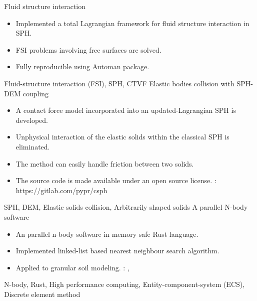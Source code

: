 \begin{experiences}
  \emptySeparator
  \experience
  {} {Fluid structure interaction}{}{}
  {}    {
    \begin{itemize}
        \item Implemented a total Lagrangian framework for fluid structure interaction in SPH.
        \item FSI problems involving free surfaces are solved.
        \item Fully reproducible using Automan package.
    \end{itemize}
  }
  {Fluid-structure interaction (FSI), SPH, CTVF}
  \emptySeparator
  \experience
  {} {Elastic bodies collision with SPH-DEM coupling}{}{}
  {} {
                      \begin{itemize}
                      \item  A contact force model incorporated into an updated-Lagrangian SPH is developed.
                      \item  Unphysical interaction of the elastic solids within the classical SPH is eliminated.
                      \item  The method can easily handle friction between two solids.
                      \item  The source code is made available under an open source license.
                        \faGithub:  {https://gitlab.com/pypr/csph}
                      \end{itemize}
                    }
                    {SPH, DEM, Elastic solids collision, Arbitrarily shaped solids}
  \emptySeparator
  \experience
  {} {A parallel N-body software}{}{}
  {}    {
    \begin{itemize}
      \item An parallel n-body software in memory safe Rust language.
      \item Implemented linked-list based nearest neighbour search algorithm.
      \item Applied to granular soil modeling.
        \faGithub: ,
    \end{itemize}
  }
  {N-body, Rust, High performance computing, Entity-component-system (ECS), Discrete element method}


\end{experiences}
